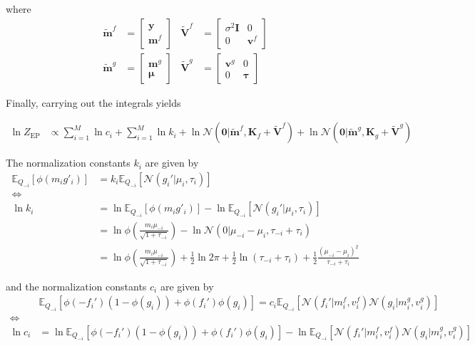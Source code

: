 \documentclass[10pt,a4paper]{article}
\begin{document}
where
\begin{align}
\tilde{\mathbf{m}}^f&= \begin{bmatrix}\bm{y}\\ \mathbf{m}^f\end{bmatrix} 	& \tilde{\mathbf{V}}^f &= \begin{bmatrix}\sigma^2 \bm{I}&0\\0&\mathbf{v}^f\end{bmatrix}\\
\tilde{\mathbf{m}}^g &= \begin{bmatrix}\mathbf{m}^g\\\bm{\mu} \end{bmatrix} & \tilde{\mathbf{V}}^g &= \begin{bmatrix}\mathbf{v}^g&0\\0&\bm{\tau}\end{bmatrix} 
\end{align}

Finally, carrying out the integrals yields


\begin{align}
\ln Z_\text{EP} &\propto \sum_{i=1}^M \ln c_i + \sum_{i=1}^M \ln k_i +  \ln  \mathcal{N}\left( \bm{0} |  \tilde{\mathbf{m}}^f, \bm{K}_f + \tilde{\mathbf{V}}^f\right)  +  \ln  \mathcal{N}\left( \bm{0} |  \tilde{\mathbf{m}}^g, \bm{K}_g + \tilde{\mathbf{V}}^g\right)
\end{align}

 The normalization constants $k_i$ are given by
\begin{align}
	\mathbb{E}_{Q_{-i}}\left[\phi\left(m_i g'_i\right)\right] &= k_i \mathbb{E}_{Q_{-i}}\left[\mathcal{N}\left(g_i'|\mu_i, \tau_i\right)\right] \\
	\iff &\nonumber\\
	\ln k_i &= \ln \mathbb{E}_{Q_{-i}}\left[\phi\left(m_i g'_i\right)\right] - \ln \mathbb{E}_{Q_{-i}}\left[\mathcal{N}\left(g_i'|\mu_i, \tau_i\right)\right]\\
	&= \ln \phi\left(\frac{m_i \mu_{-i}}{\sqrt{1 + \tau_{-i}}}\right) - \ln \mathcal{N}\left(0|\mu_{-i} - \mu_i, \tau_{-i} + \tau_i\right)\\	
	&= \ln \phi\left(\frac{m_i \mu_{-i}}{\sqrt{1 + \tau_{-i}}}\right) +\frac12 \ln2\pi + \frac12 \ln\left(\tau_{-i} + \tau_i\right) + \frac12\frac{(\mu_{-i} - \mu_i)^2}{\tau_{-i} + \tau_i} 
\end{align}


 and the normalization constants $c_i$ are given by
\begin{align}
	&\mathbb{E}_{Q_{-i}}\left[\phi\left(-f_i'\right)(1-\phi(g_i)) + \phi\left(f_i'\right)\phi(g_i)\right] = c_i \mathbb{E}_{Q_{-i}}\left[\mathcal{N}\left(f_i'|m^f_i, v^f_i\right)\mathcal{N}\left(g_i|m^g_i, v^g_i\right)\right] \\
	\iff &\nonumber\\
	\ln c_i &= \ln \mathbb{E}_{Q_{-i}}\left[\phi\left(-f_i'\right)(1-\phi(g_i)) + \phi\left(f_i'\right)\phi(g_i)\right] - \ln \mathbb{E}_{Q_{-i}}\left[\mathcal{N}\left(f_i'|m^f_i, v^f_i\right)\mathcal{N}\left(g_i|m^g_i, v^g_i\right)\right]\\
\end{align}
\end{document}
